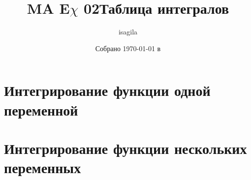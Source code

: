 \documentclass[a4paper]{article}
\title{\huge \textbf{MA E\(\chi\) 02}}
\author{isagila}
\date{Собрано {\ddmmyyyydate\today} в \currenttime}
\begin{document}
\setlength{\abovedisplayskip}{-5pt}
\setlength{\abovedisplayshortskip}{0pt}
\setlength{\belowdisplayskip}{0pt}
\setlength{\belowdisplayshortskip}{0pt}

\clearpage
\maketitle
\thispagestyle{empty}
\newpage
\setcounter{page}{2}
\title{\huge \textbf{Таблица интегралов}}

\pagebreak
\tableofcontents

\newpage
\section{Интегрирование функции одной переменной}

\begin{questions}
  
  
  
  
  
  
  
  
  
  
  
  
  
  
  
  
  
  
  
  
  
  
  
  
\end{questions}

\newpage
\section{Интегрирование функции нескольких переменных}

\begin{questions}
  
  
  
  
  
  
  
  
  
  
  
  
  
  
  
  
  
  
  
  
  
  
  
\end{questions}
\end{document}
